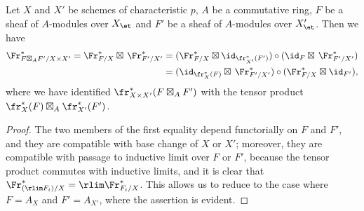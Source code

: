 \begin{proposition}\label{scheme Frobenius correspondence and product}
Let $X$ and $X'$ be schemes of characteristic $p$, $A$ be a commutative ring, $F$ be a sheaf of $A$-modules over $X_\et$ and $F'$ be a sheaf of $A$-modules over $X'_\et$. Then we have
\begin{equation}\label{scheme Frobenius correspondence and product-1}
\begin{aligned}
\Fr_{F\boxtimes_AF'/X\times X'}^*=\Fr_{F/X}^*\boxtimes\,\Fr_{F'/X'}^*
&=(\Fr_{F/X}^*\boxtimes\id_{\fr_{X'}^*(F')})\circ(\id_F\boxtimes\,\Fr_{F'/X'}^*)\\
&=(\id_{\fr_X^*(F)}\boxtimes\,\Fr_{F'/X'}^*)\circ(\Fr_{F/X}^*\boxtimes\id_{F'}),
\end{aligned}
\end{equation}
where we have identified $\fr_{X\times X'}^*(F\boxtimes_AF')$ with the tensor product $\fr_X^*(F)\boxtimes_A\fr_{X'}^*(F')$.
\end{proposition}
\begin{proof}
The two members of the first equality depend functorially on $F$ and $F'$, and they are compatible with base change of $X$ or $X'$; moreover, they are compatible with passage to inductive limit over $F$ or $F'$, because the tensor product commutes with inductive limits, and it is clear that $\Fr_{(\rlim F_i)/X}^*=\rlim\Fr_{F_i/X}^*$. This allows us to reduce to the case where $F=A_X$ and $F'=A_{X'}$, where the assertion is evident.
\end{proof}

